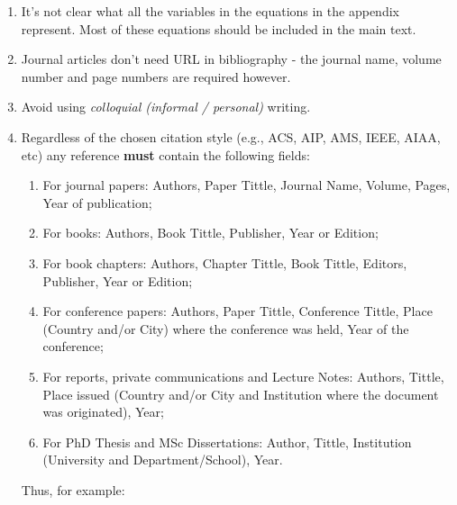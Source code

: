 \documentclass[14pt,twoside]{report}
\begin{document}
\begin{enumerate}
\begin{enumerate}
%
\item It's not clear what all the variables in the equations in the appendix represent. Most of these equations should be included in the main text.
%
\item Journal articles don't need URL in bibliography - the journal name, volume number and page numbers are required however.
%
%
\item Avoid using {\it colloquial (informal / personal)} writing.
%
\item Regardless of the chosen citation style (e.g., ACS, AIP, AMS, IEEE, AIAA, etc) any reference {\bf must} contain the following fields: 
\begin{enumerate}
\item For journal papers: Authors, Paper Tittle, Journal Name, Volume, Pages, Year of publication;
\item For books: Authors, Book Tittle, Publisher, Year or Edition;
\item For book chapters: Authors, Chapter Tittle, Book Tittle, Editors, Publisher, Year or Edition;
\item For conference papers: Authors, Paper Tittle, Conference Tittle, Place (Country and/or City) where the conference was held, Year of the conference;
\item For reports,  private communications and Lecture Notes: Authors, Tittle, Place issued (Country and/or City and Institution where the document was originated), Year;
\item For PhD Thesis and MSc Dissertations: Author, Tittle, Institution (University and Department/School), Year.
\end{enumerate}  
Thus, for example:
%
\end{enumerate}


\end{enumerate}
\end{document}
